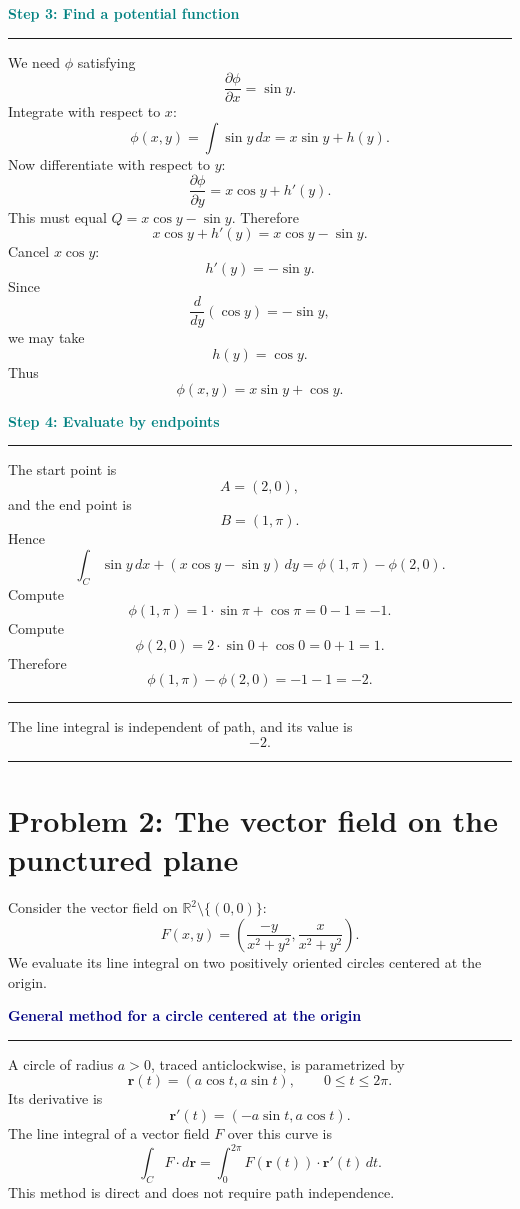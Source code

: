 \documentclass[11pt,a4paper]{article}
\newenvironment{methodbox}[1]{%
  \par\medskip
  \noindent\textcolor{navy}{\bfseries #1}\par
  \noindent\textcolor{navy}{\rule{\linewidth}{0.55pt}}\par\smallskip
}{\par\medskip}
\newenvironment{reasonbox}[1]{%
  \par\medskip
  \noindent\textcolor{teal}{\bfseries #1}\par
  \noindent\textcolor{teal}{\rule{0.72\linewidth}{0.45pt}}\par\smallskip
}{\par\medskip}
\newenvironment{answerbox}{%
  \par\medskip
  \noindent\textcolor{orange}{\rule{\linewidth}{0.8pt}}\par
  \begingroup\bfseries
}{%
  \par\endgroup
  \noindent\textcolor{orange}{\rule{\linewidth}{0.8pt}}\par\medskip
}
\newcommand{\R}{\mathbb{R}}
\newcommand{\pd}[2]{\frac{\partial #1}{\partial #2}}
\begin{document}
\begin{reasonbox}{Step 3: Find a potential function}
We need \(\phi\) satisfying
\[
\pd{\phi}{x}=\sin y.
\]
Integrate with respect to \(x\):
\[
\phi(x,y)=\int \sin y\,dx=x\sin y+h(y).
\]
Now differentiate with respect to \(y\):
\[
\pd{\phi}{y}=x\cos y+h'(y).
\]
This must equal \(Q=x\cos y-\sin y\). Therefore
\[
x\cos y+h'(y)=x\cos y-\sin y.
\]
Cancel \(x\cos y\):
\[
h'(y)=-\sin y.
\]
Since
\[
\frac{d}{dy}(\cos y)=-\sin y,
\]
we may take
\[
h(y)=\cos y.
\]
Thus
\[
\phi(x,y)=x\sin y+\cos y.
\]
\end{reasonbox}

\begin{reasonbox}{Step 4: Evaluate by endpoints}
The start point is
\[
A=(2,0),
\]
and the end point is
\[
B=(1,\pi).
\]
Hence
\[
\int_C \sin y\,dx+\left(x\cos y-\sin y\right)\,dy=\phi(1,\pi)-\phi(2,0).
\]
Compute
\[
\phi(1,\pi)=1\cdot\sin \pi+\cos\pi=0-1=-1.
\]
Compute
\[
\phi(2,0)=2\cdot\sin 0+\cos0=0+1=1.
\]
Therefore
\[
\phi(1,\pi)-\phi(2,0)=-1-1=-2.
\]
\end{reasonbox}

\begin{answerbox}
The line integral is independent of path, and its value is
\[
\boxed{-2}.
\]
\end{answerbox}

\newpage
\section{Problem 2: The vector field on the punctured plane}

Consider the vector field on \(\R^2\setminus\{(0,0)\}\):
\[
F(x,y)=\left(\frac{-y}{x^2+y^2},\frac{x}{x^2+y^2}\right).
\]
We evaluate its line integral on two positively oriented circles centered at the origin.

\begin{methodbox}{General method for a circle centered at the origin}
A circle of radius \(a>0\), traced anticlockwise, is parametrized by
\[
\mathbf r(t)=(a\cos t,a\sin t),\qquad 0\leq t\leq 2\pi.
\]
Its derivative is
\[
\mathbf r'(t)=(-a\sin t,a\cos t).
\]
The line integral of a vector field \(F\) over this curve is
\[
\int_C F\cdot d\mathbf r=\int_0^{2\pi}F(\mathbf r(t))\cdot \mathbf r'(t)\,dt.
\]
This method is direct and does not require path independence.
\end{methodbox}
\end{document}
